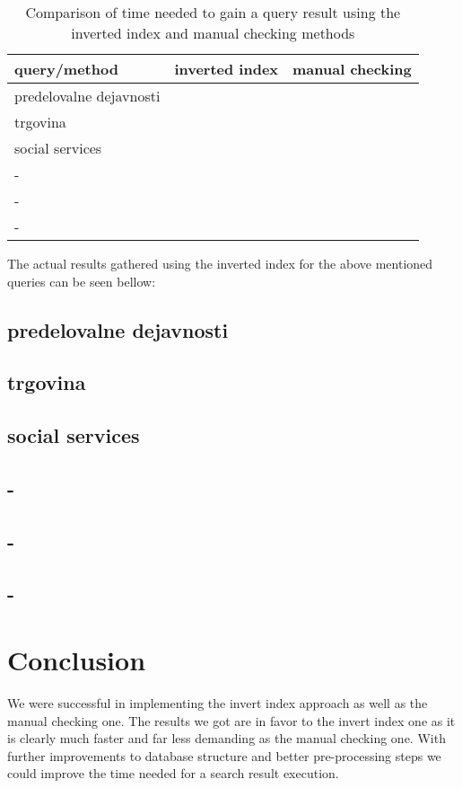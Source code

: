\documentclass[9pt]{IEEEtran}
\begin{document}
\begin{table}[ht]
\begin{tabu} to 1.0\columnwidth {|X[l]| X[l] | X[l] |}
\hline
query/method            & inverted index & manual checking \\ \hline
predelovalne dejavnosti &                &                 \\ \hline
trgovina                &                &                 \\ \hline
social services         &                &                 \\ \hline
-                       &                &                 \\ \hline
-                       &                &                 \\ \hline
-                       &                &                 \\ \hline
\end{tabu}
\label{tab1}
\caption{Comparison of time needed to gain a query result using the inverted index and manual checking methods}
\end{table}

The actual results gathered using the inverted index for the above mentioned queries can be seen bellow:

\subsection{predelovalne dejavnosti}
\subsection{trgovina}
\subsection{social services}
\subsection{-}
\subsection{-}
\subsection{-}

\section{Conclusion}

We were successful in implementing the invert index approach as well as the manual checking one.
The results we got are in favor to the invert index one as it is clearly much faster and far less demanding as the manual checking one.
With further improvements to database structure and better pre-processing steps we could improve the time needed for a search result execution.



\end{document}
